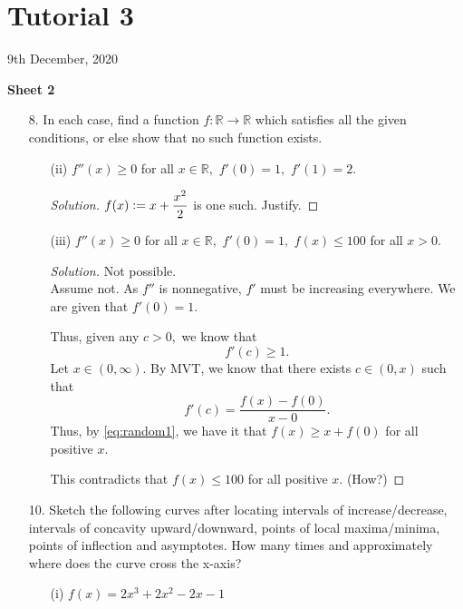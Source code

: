\documentclass[12pt]{article}
\theoremstyle{definition}
\newenvironment{soln}{\begin{proof}[Solution]}{\end{proof}}
\begin{document}
\newpage\section{Tutorial 3}
\begin{center}
	9th December, 2020
\end{center}
\textbf{Sheet 2}
\begin{itemize}
	\item[8.] In each case, find a function $f:\mathbb{R}\to\mathbb{R}$ which satisfies all the given conditions, or else show that no such function exists.
	\begin{itemize}
		\item[(ii)] $f''(x) \ge 0$ for all $x \in \mathbb{R},$ $f'(0) = 1,$ $f'(1) = 2.$

		\begin{soln}
			$f(x) \vcentcolon= x + \dfrac{x^2}{2}$ is one such. Justify.
		\end{soln}

		\item[(iii)] $f''(x) \ge 0$ for all $x \in \mathbb{R},$ $f'(0) = 1,$ $f(x) \le 100$ for all $x > 0.$
		\begin{soln}
			Not possible.\\
			Assume not. As $f''$ is nonnegative, $f'$ must be increasing everywhere. We are given that $f'(0) = 1.$ 

			Thus, given any $c > 0,$ we know that 
			\begin{equation} \label{eq:random1} \tag{$*$}
				f'(c) \ge 1.
			\end{equation}
			Let $x \in (0, \infty).$ By MVT, we know that there exists $c \in (0, x)$ such that 
			\begin{equation*} 
				f'(c) = \dfrac{f(x) - f(0)}{x - 0}.
			\end{equation*} 
			Thus, by \cref{eq:random1}, we have it that $f(x) \ge x + f(0)$ for all positive $x.$ 

			This contradicts that $f(x) \le 100$ for all positive $x.$ (How?)
		\end{soln}
	\end{itemize}
	\newpage

	\item[10.] Sketch the following curves after locating intervals of increase/decrease, intervals of concavity upward/downward, points of local maxima/minima, points of inflection and asymptotes. How many times and approximately where does the curve cross the x-axis?
	\begin{itemize}
		\item[(i)] $f(x) = 2x^3 + 2x^2 - 2x - 1$ 


\end{itemize}
\end{itemize}
\end{document}
